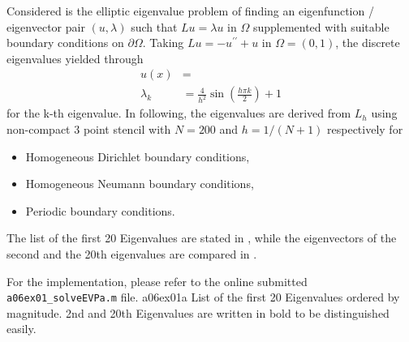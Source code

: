 \newcommand{\assignmentDate}{December 6th, 2019}



Considered is the elliptic eigenvalue problem of finding an eigenfunction / eigenvector pair $(u, \lambda)$ such that $L u = \lambda u$ in $\Omega$ supplemented with suitable boundary conditions on $\partial \Omega$.
%
Taking $L u = -u^{\prime \prime} + u$ in $\Omega = (0,1)$, the discrete eigenvalues yielded through
%
\begin{align}
	u(x) 	   &= \\
	\lambda _k &= \frac{4}{h^2} \sin{\left( \frac{h \pi k}{2}\right)} + 1
\end{align}
%
for the k-th eigenvalue.
%
In following, the eigenvalues are derived from $L_h$ using non-compact 3 point stencil with $N = 200$ and $h = 1/(N+1)$ respectively for
%
\begin{itemize}
	\item Homogeneous Dirichlet boundary conditions,
	\item Homogeneous Neumann boundary conditions,
	\item Periodic boundary conditions.
\end{itemize}
%
The list of the first 20 Eigenvalues  are stated in , while the eigenvectors of the second and the 20th eigenvalues are compared in .
%
\par
For the implementation, please refer to the online submitted \texttt{a06ex01\_solveEVPa.m} file.
		 {a06ex01a}
		 {List of the first 20 Eigenvalues ordered by magnitude.
		  2nd and 20th Eigenvalues are written in bold to be distinguished easily.}

